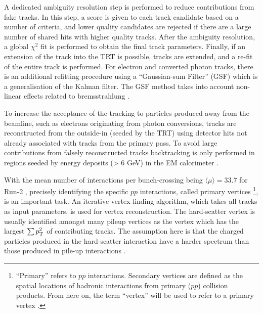 A dedicated ambiguity resolution step is performed to reduce contributions from fake tracks. In this step, a score is given to each track candidate based on a number of criteria, and lower quality candidates are rejected if there are a large number of shared hits with higher quality tracks. After the ambiguity resolution, a global $\chi^2$ fit is performed to obtain the final track parameters. Finally, if an extension of the track into the TRT is possible, tracks are extended, and a re-fit of the entire track is performed. For electron and converted photon tracks, there is an additional refitting procedure using a ``Gaussian-sum Filter'' (GSF) which is a generalisation of the Kalman filter. The GSF method takes into account non-linear effects related to bremsstrahlung \cite{Atlas:egam_reco_gsf}.  

To increase the acceptance of the tracking to particles produced away from the beamline, such as electrons originating from photon conversions, tracks are reconstructed from the outside-in (seeded by the TRT) using detector hits not already associated with tracks from the primary pass. To avoid large contributions from falsely reconstructed tracks backtracking is only performed in regions seeded by energy deposits (\et > 6 GeV) in the EM calorimeter \cite{Atlas:trackreco_run3}.

With the mean number of interactions per bunch-crossing being $\langle\mu\rangle=33.7$ for Run-2 \cite{Atlas:mu}, precisely identifying the specific $pp$ interactions, called primary vertices \footnote{``Primary'' refers to $pp$ interactions. Secondary vertices are defined as the spatial locations of hadronic interactions from primary ($pp$) collision products. From here on, the term ``vertex'' will be used to refer to a primary vertex \cite{ATLAS:sv}.}, is an important task. An iterative vertex finding algorithm, which takes all tracks as input parameters, is used for vertex reconstruction. %
The hard-scatter vertex is usually identified amongst many pileup vertices as the vertex which has the largest $\sum p_{\text{T}}^2$ of contributing tracks. The assumption here is that the charged particles produced in the hard-scatter interaction have a harder \pt spectrum than those produced in pile-up interactions \cite{Atlas:trackreco_run3, Atlas:pvreco}.

